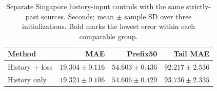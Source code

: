 \begin{table}[t]
\centering\footnotesize\setlength{\tabcolsep}{3pt}
\caption{Separate Singapore history-input controls with the same strictly-past sources. Seconds; mean $\pm$ sample SD over three initializations. Bold marks the lowest error within each comparable group.}\label{tab:history}
\begin{tabular}{lrrr}\toprule
Method & MAE & Prefix50 & Tail MAE\\\midrule
History + loss & $\mathbf{19.304\pm0.116}$ & $\mathbf{54.603\pm0.436}$ & $\mathbf{92.217\pm2.536}$\\
History only & $19.324\pm0.106$ & $54.606\pm0.429$ & $93.736\pm2.335$\\
\bottomrule\end{tabular}
\end{table}
